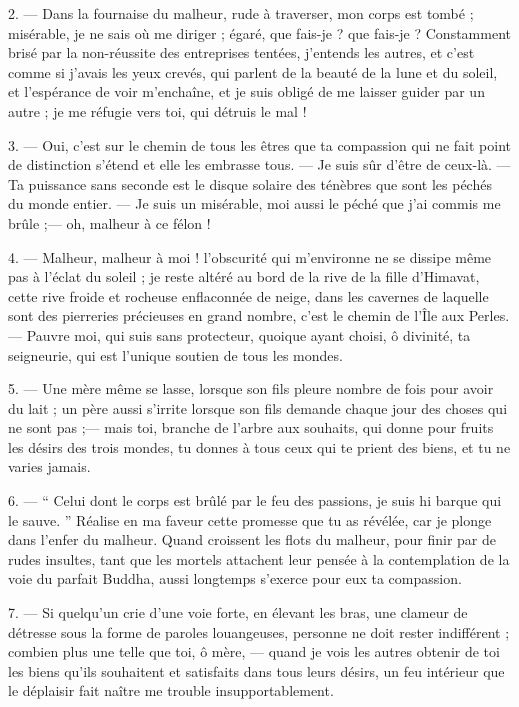 \documentclass[a4paper, 11pt, oneside, french]{article}
\begin{document}
2. --- Dans la fournaise du malheur, rude à traverser, mon corps est tombé ; misérable, je ne sais où me diriger ; égaré, que fais-je ? que fais-je ? Constamment brisé par la non-réussite des entreprises tentées, j'entends les autres, et c'est comme si j'avais les yeux crevés, qui parlent de la beauté de la lune et du soleil, et l'espérance de voir m'enchaîne, et je suis obligé de me laisser guider par un autre ; je me réfugie vers toi, qui détruis le mal !

3. --- Oui, c'est sur le chemin de tous les êtres que ta compassion qui ne fait point de distinction s'étend et elle les embrasse tous. --- Je suis sûr d'être de ceux-là. --- Ta puissance sans seconde est le disque solaire des ténèbres que sont les péchés du monde entier. --- Je suis un misérable, moi aussi le péché que j'ai commis me brûle ;--- oh, malheur à ce félon !

4. --- Malheur, malheur à moi ! l'obscurité qui m'environne ne se dissipe même pas à l'éclat du soleil ; je reste altéré au bord de la rive de la fille d'Himavat, cette rive froide et rocheuse enflaconnée de neige, dans les cavernes de laquelle sont des pierreries précieuses en grand nombre, c'est le chemin de l'Île aux Perles. --- Pauvre moi, qui suis sans protecteur, quoique ayant choisi, ô divinité, ta seigneurie, qui est l'unique soutien de tous les mondes.

5. --- Une mère même se lasse, lorsque son fils pleure nombre de fois pour avoir du lait ; un père aussi s'irrite lorsque son fils demande chaque jour des choses qui ne sont pas ;--- mais toi, branche de l'arbre aux souhaits, qui donne pour fruits les désirs des trois mondes, tu donnes à tous ceux qui te prient des biens, et tu ne varies jamais.

6. --- `` Celui dont le corps est brûlé par le feu des passions, je suis hi barque qui le sauve. '' Réalise en ma faveur cette promesse que tu as révélée, car je plonge dans l'enfer du malheur. Quand croissent les flots du malheur, pour finir par de rudes insultes, tant que les mortels attachent leur pensée à la contemplation de la voie du parfait Buddha, aussi longtemps s'exerce pour eux ta compassion.

7. --- Si quelqu'un crie d'une voie forte, en élevant les bras, une clameur de détresse sous la forme de paroles louangeuses, personne ne doit rester indifférent ; combien plus une telle que toi, ô mère, --- quand je vois les autres obtenir de toi les biens qu'ils souhaitent et satisfaits dans tous leurs désirs, un feu intérieur que le déplaisir fait naître me trouble insupportablement.
\end{document}
